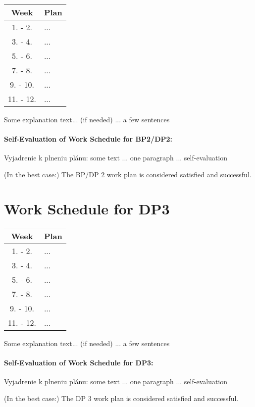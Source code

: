 \begin{table}[ht]
    \centering
    \begin{tabular}{c|l}
    \toprule
        Week & Plan \\
    \midrule
        1. - 2.     & ... \\
        3. - 4.     & ... \\
        5. - 6.     & ... \\
        7. - 8.     & ... \\
        9. - 10.    & ... \\
        11. - 12.   & ... \\
    \bottomrule
    \end{tabular}
    \label{tab:dp2}
\end{table}

Some explanation text... (if needed) ... a few sentences

\paragraph{Self-Evaluation of Work Schedule for BP2/DP2:}
Vyjadrenie k plneniu plánu: some text ... one paragraph ... self-evaluation

(In the best case:) The BP/DP 2 work plan is considered satisfied and successful.



\section{Work Schedule for DP3}
\label{sec:Work-Schedule-3rd-semester}

\begin{table}[ht]
    \centering
    \begin{tabular}{c|l}
    \toprule
        Week & Plan \\
    \midrule
        1. - 2.     & ... \\
        3. - 4.     & ... \\
        5. - 6.     & ... \\
        7. - 8.     & ... \\
        9. - 10.    & ... \\
        11. - 12.   & ... \\
    \bottomrule
    \end{tabular}
    \label{tab:dp3}
\end{table}

Some explanation text... (if needed) ... a few sentences

\paragraph{Self-Evaluation of Work Schedule for DP3:}
Vyjadrenie k plneniu plánu: some text ... one paragraph ... self-evaluation

(In the best case:) The DP 3 work plan is considered satisfied and successful.